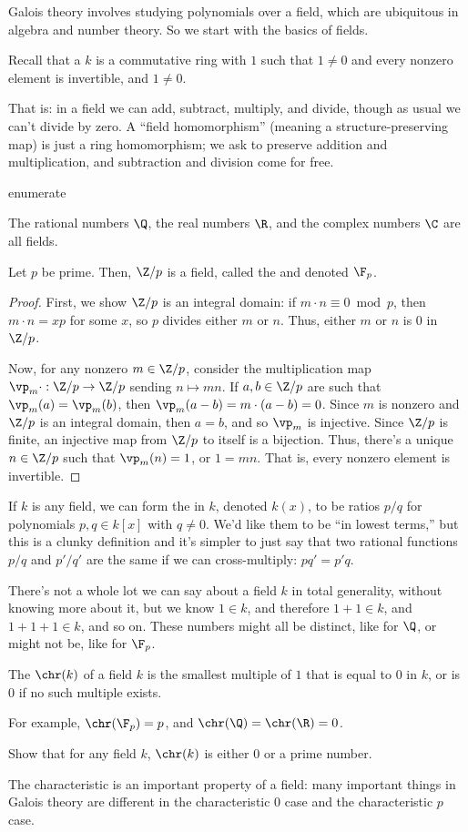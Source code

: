 Galois theory involves studying polynomials over a field, which are ubiquitous in algebra and number theory. So we
start with the basics of fields.
\begin{defn}
Recall that a  $k$ is a commutative ring with $1$ such that $1\ne 0$ and every nonzero element is
invertible, and $1\ne 0$.
\end{defn}
That is: in a field we can add, subtract, multiply, and divide, though as usual we can't divide by zero. A ``field
homomorphism'' (meaning a structure-preserving map) is just a ring homomorphism; we ask to preserve addition and
multiplication, and subtraction and division come for free.
\begin{comp}{ex}{enumerate}
	\item The rational numbers $\Q$, the real numbers $\R$, and the complex numbers $\C$ are all fields.
	\item Let $p$ be prime. Then, $\Z/p$ is a field, called the  and denoted
	$\F_p$.
	\begin{proof}
	First, we show $\Z/p$ is an integral domain: if $m\cdot n\equiv 0\bmod p$, then $m\cdot n = xp$ for some $x$,
	so $p$ divides either $m$ or $n$. Thus, either $m$ or $n$ is $0$ in $\Z/p$.

	Now, for any nonzero $m\in\Z/p$, consider the multiplication map $\vp_m\cdot:\Z/p\to\Z/p$ sending $n\mapsto
	mn$. If $a,b\in\Z/p$ are such that $\vp_m(a) = \vp_m(b)$, then $\vp_m(a-b) = m\cdot(a-b) = 0$. Since $m$ is
	nonzero and $\Z/p$ is an integral domain, then $a = b$, and so $\vp_m$ is injective. Since $\Z/p$ is finite, an
	injective map from $\Z/p$ to itself is a bijection. Thus, there's a unique $n\in\Z/p$ such that $\vp_m(n) = 1$,
	or $1 = mn$. That is, every nonzero element is invertible.
	\end{proof}
	\item If $k$ is any field, we can form the  in $k$, denoted $k(x)$, to be
	ratios $p/q$ for polynomials $p,q\in k[x]$ with $q\ne 0$. We'd like them to be ``in lowest terms,'' but this is
	a clunky definition and it's simpler to just say that two rational functions $p/q$ and $p'/q'$ are the same if
	we can cross-multiply: $pq' = p'q$.
\end{comp}
There's not a whole lot we can say about a field $k$ in total generality, without knowing more about it, but we
know $1\in k$, and therefore $1+1\in k$, and $1+1+1\in k$, and so on. These numbers might all be distinct, like for
$\Q$, or might not be, like for $\F_p$.
\begin{defn}
The  $\chr(k)$ of a field $k$ is the smallest multiple of $1$ that is equal to $0$ in $k$, or
is $0$ if no such multiple exists.
\end{defn}
For example, $\chr(\F_p) = p$, and $\chr(\Q) = \chr(\R) = 0$.
\begin{ex}
Show that for any field $k$, $\chr(k)$ is either $0$ or a prime number.
\end{ex}
The characteristic is an important property of a field: many important things in Galois theory are different in the
characteristic $0$ case and the characteristic $p$ case.

